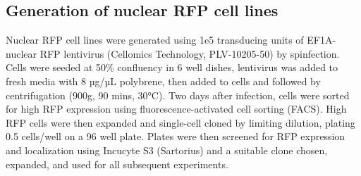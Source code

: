 \documentclass[9pt,lineno]{elife}
\begin{document}
\subsection{Generation of nuclear RFP cell lines}
Nuclear RFP cell lines were generated using 1e5 transducing units of EF1A-nuclear RFP lentivirus (Cellomics Technology, PLV-10205-50) by spinfection.
Cells were seeded at 50\% confluency in 6 well dishes, lentivirus was added to fresh media with 8 µg/µL polybrene, then added to cells and followed by centrifugation (900g, 90 mins, 30°C).
Two days after infection, cells were sorted for high RFP expression using fluorescence-activated cell sorting (FACS).
High RFP cells were then expanded and single-cell cloned by limiting dilution, plating 0.5 cells/well on a 96 well plate.
Plates were then screened for RFP expression and localization using Incucyte S3 (Sartorius) and a suitable clone chosen, expanded, and used for all subsequent experiments.
\end{document}
